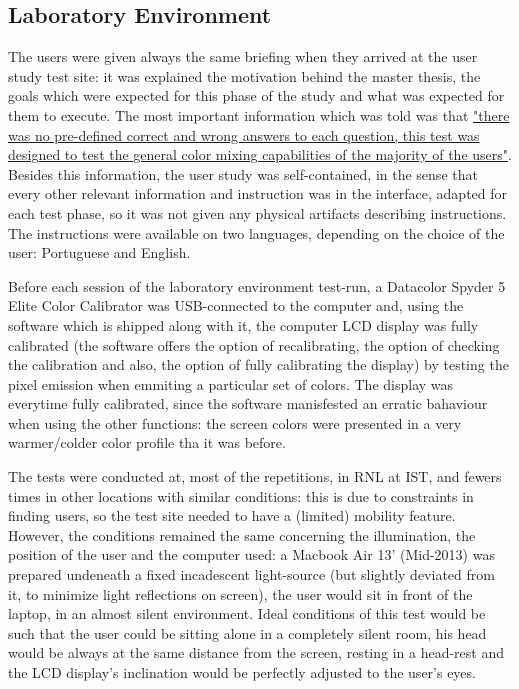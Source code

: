 \subsection{Laboratory Environment}
%
The users were given always the same briefing when they arrived at the user study test site: it was explained the motivation behind the master
thesis, the goals which were expected for this phase of the study and what was expected for them to execute. The most important information which
was told was that \ul{"there was no pre-defined correct and wrong answers to each question, this test was designed to test the general
color mixing capabilities of the majority of the users"}. Besides this information, the user study was self-contained, in the sense that
every other relevant information and instruction was in the interface, adapted for each test phase, so it was not given any physical artifacts
describing instructions. The instructions were available on two languages, depending on the choice of the user: Portuguese and English. \par
%
Before each session of the laboratory environment test-run, a Datacolor Spyder 5 Elite Color Calibrator was USB-connected to the computer and, using
the software which is shipped along with it, the computer LCD display was fully calibrated (the software offers the option of recalibrating,
the option of checking the calibration and also, the option of fully calibrating the display) by testing the pixel emission when emmiting a particular
set of colors. The display was everytime fully calibrated, since the software manisfested an erratic bahaviour when using the other functions:
the screen colors were presented in a very warmer/colder color profile tha it was before. \par
%
The tests were conducted at, most of the repetitions, in \gls{RNL} at \gls{IST}, and fewers times in other locations with similar conditions:
this is due to constraints in finding users, so the test site needed to have a (limited) mobility feature. However, the conditions remained
the same concerning the illumination, the position of the user and the computer used: a Macbook Air 13' (Mid-2013) was prepared undeneath
a fixed incadescent light-source (but slightly deviated from it, to minimize light reflections on screen), the user would sit in front
of the laptop, in an almost silent environment. Ideal conditions of this test would be such that the user could be sitting alone in a completely
silent room, his head would be always at the same distance from the screen, resting in a head-rest and the LCD display's inclination would be perfectly
adjusted to the user's eyes. \par
%
